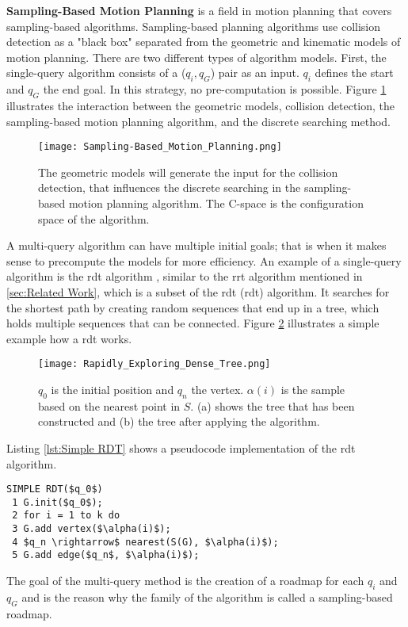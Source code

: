 \textbf{Sampling-Based Motion Planning} is a field in motion planning that covers sampling-based algorithms. Sampling-based planning algorithms use collision detection as a "black box" separated from the geometric and kinematic models of motion planning. There are two different types of algorithm models. First, the single-query algorithm consists of a ($q_i,q_G$) pair as an input. $q_i$ defines the start and $q_G$ the end goal. In this strategy, no pre-computation is possible. Figure \ref{fig:Geometric Models Collision Detection Algorithm} illustrates the interaction between the geometric models, collision detection, the sampling-based motion planning algorithm, and the discrete searching method.
\begin{figure}[H]
    \centering
    \texttt{[image: Sampling-Based\_Motion\_Planning.png]}
    \caption{The geometric models will generate the input for the collision detection, that influences the discrete searching in the sampling-based motion planning algorithm. The C-space is the configuration space of the algorithm. \cite{planning_algorithms_steven_m_lavalle}}
    \label{fig:Geometric Models Collision Detection Algorithm}
\end{figure}
A multi-query algorithm can have multiple initial goals; that is when it makes sense to precompute the models for more efficiency. An example of a single-query algorithm is the \acrshort{rdt} algorithm , similar to the \acrshort{rrt} algorithm mentioned in \ref{sec:Related Work}, which is a subset of the \acrlong{rdt} (\acrshort{rdt}) algorithm. It searches for the shortest path by creating random sequences that end up in a tree, which holds multiple sequences that can be connected. Figure \ref{fig:Rapidly Exploring Dense Tree} illustrates a simple example how a \acrshort{rdt} works.
\begin{figure}[H]
    \centering
    \texttt{[image: Rapidly\_Exploring\_Dense\_Tree.png]}
    \caption{$q_0$ is the initial position and $q_n$ the vertex. $\alpha(i)$ is the sample based on the nearest point in $S$. (a) shows the tree that has been constructed and (b) the tree after applying the algorithm. \cite{planning_algorithms_steven_m_lavalle}}
    \label{fig:Rapidly Exploring Dense Tree}
\end{figure}

Listing \ref{lst:Simple RDT} shows a pseudocode implementation of the \acrshort{rdt} algorithm.
\begin{lstlisting}[mathescape=true, caption={The simple \acrshort{rdt} computes a random tree with the nearest function. \cite{planning_algorithms_steven_m_lavalle}}, label={lst:Simple RDT}]
SIMPLE RDT($q_0$)
 1 G.init($q_0$);
 2 for i = 1 to k do
 3 G.add vertex($\alpha(i)$);
 4 $q_n \rightarrow$ nearest(S(G), $\alpha(i)$);
 5 G.add edge($q_n$, $\alpha(i)$);
\end{lstlisting}
The goal of the multi-query method is the creation of a roadmap for each $q_i$ and $q_G$ and is the reason why the family of the algorithm is called a sampling-based roadmap. \cite{planning_algorithms_steven_m_lavalle}

